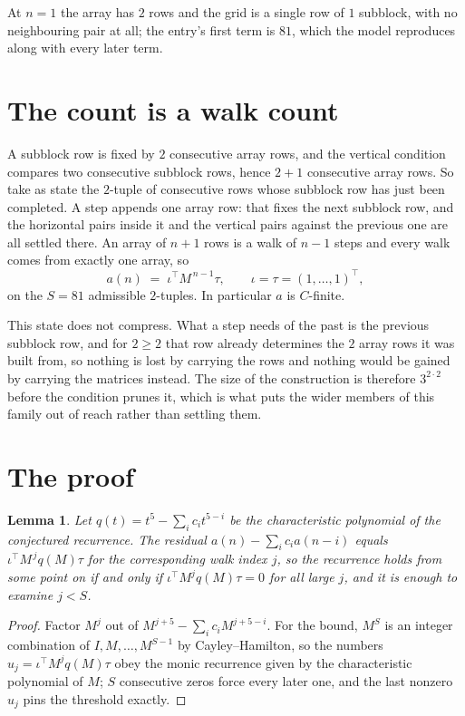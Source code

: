 \documentclass[11pt,a4paper]{article}
\theoremstyle{plain}
\newtheorem{lemma}[theorem]{Lemma}
\theoremstyle{definition}
\begin{document}
At $n=1$ the array has $2$ rows and the grid is a single row of $1$
subblock, with no neighbouring pair at all; the entry's first term is
$81$, which the model reproduces along with every later term.

\section{The count is a walk count}

A subblock row is fixed by $2$ consecutive array rows, and the vertical condition compares
two consecutive subblock rows, hence $2+1$ consecutive array rows. So take as state the
$2$-tuple of consecutive rows whose subblock row has just been completed. A step appends one
array row: that fixes the next subblock row, and the horizontal pairs inside it and the
vertical pairs against the previous one are all settled there. An array of $n+1$ rows is
a walk of $n-1$ steps and every walk comes from exactly one array, so
\[
a(n)\;=\;\iota^{\!\top}M^{\,n-1}\tau,\qquad\iota=\tau=(1,\dots,1)^{\!\top},
\]
on the $S=81$ admissible $2$-tuples. In particular $a$ is $C$-finite.

This state does not compress. What a step needs of the past is the previous subblock row, and
for $2\ge2$ that row already determines the $2$ array rows it was built from, so nothing
is lost by carrying the rows and nothing would be gained by carrying the matrices instead. The
size of the construction is therefore $3^{2\cdot2}$ before the condition prunes
it, which is what puts the wider members of this family out of reach rather than settling them.

\section{The proof}

\begin{lemma}\label{lem:crit}
Let $q(t)=t^{5}-\sum_i c_it^{5-i}$ be the characteristic polynomial of the
conjectured recurrence. The residual $a(n)-\sum_ic_ia(n-i)$ equals
$\iota^{\!\top}M^{\,j}q(M)\tau$ for the corresponding walk index $j$, so the recurrence
holds from some point on if and only if $\iota^{\!\top}M^{j}q(M)\tau=0$ for all large $j$,
and it is enough to examine $j<S$.
\end{lemma}

\begin{proof}
Factor $M^{j}$ out of $M^{j+5}-\sum_ic_iM^{j+5-i}$. For the bound, $M^{S}$
is an integer combination of $I,M,\dots,M^{S-1}$ by Cayley--Hamilton, so the numbers
$u_j=\iota^{\!\top}M^{j}q(M)\tau$ obey the monic recurrence given by the characteristic
polynomial of $M$; $S$ consecutive zeros force every later one, and the last nonzero $u_j$
pins the threshold exactly.
\end{proof}
\end{document}
